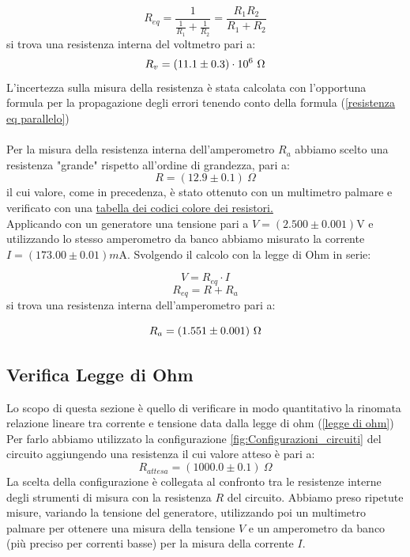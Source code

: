 \documentclass[letterpaper,12pt]{article}
\begin{document}
\begin{equation}
    \label{resistenza eq parallelo}
    R_{eq}= \frac{1}{\frac{1}{R_1} + \frac{1}{R_2}} = \frac{R_1 R_2}{R_1 + R_2}
\end{equation}
si trova una resistenza interna del voltmetro pari a:
\begin{equation}
    R_v= (11.1\pm0.3)\cdot10^6\ \Omega
    \label{resistenza voltmetro}
    \notag
\end{equation}
L'incertezza sulla misura della resistenza  è stata calcolata con l'opportuna formula per la propagazione degli errori tenendo conto della formula (\ref{resistenza eq parallelo})
\\
\\ Per la misura della resistenza interna dell'amperometro $R_a$  abbiamo scelto una resistenza "grande" rispetto all'ordine di grandezza, pari a: $$R= (12.9\pm0.1)\ \Omega$$
il cui valore, come in precedenza, è stato ottenuto con un multimetro palmare e verificato con una \href{https://www.arrow.com/it-it/research-and-events/articles/resistor-color-code}{tabella dei codici colore dei resistori.}
\\Applicando con un generatore una tensione pari a $V = (2.500\pm0.001)\text{V}$ e utilizzando lo stesso amperometro da banco abbiamo misurato la corrente $ I = (173.00\pm0.01) m\text{A}$. Svolgendo il calcolo con la legge di Ohm in serie: 

$$
    V= R_{eq} \cdot I
$$
\begin{equation}
    R_{eq}= R + R_a
    \label{resistenza eq serie}
\end{equation}
si trova una resistenza interna dell'amperometro pari a:

\begin{equation}
    R_a= (1.551\pm0.001)\ \Omega
    \label{resistenza amperometro}
    \notag
\end{equation}

\subsection{Verifica Legge di Ohm}
Lo scopo di questa sezione è quello di verificare in modo quantitativo la rinomata relazione lineare tra corrente e tensione data dalla legge di ohm (\ref{legge di ohm})\\
Per farlo abbiamo utilizzato la configurazione \ref{fig:Configurazioni_circuiti}  del circuito aggiungendo una resistenza il cui valore atteso è pari a: $$R_{attesa} = (1000.0\pm0.1)\ \Omega$$
La scelta della configurazione è collegata al confronto tra le resistenze interne degli strumenti di misura con la resistenza $R$ del circuito. 
Abbiamo preso ripetute misure, variando la tensione del generatore, utilizzando poi un multimetro palmare per ottenere una misura della tensione $V$ e un amperometro da banco (più preciso per correnti basse) per la misura della corrente $I$.
\\
\end{document}
